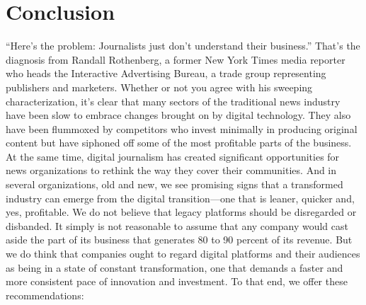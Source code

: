 \chapter{Conclusion}
``Here’s the problem: Journalists just don’t understand their business.''
That’s the diagnosis from Randall Rothenberg, a former New York Times media
reporter who heads the Interactive Advertising Bureau, a trade group representing
publishers and marketers.
Whether or not you agree with his sweeping characterization, it’s clear that
many sectors of the traditional news industry have been slow to embrace changes
brought on by digital technology. They also have been flummoxed by competitors
who invest minimally in producing original content but have siphoned off
some of the most profitable parts of the business.
At the same time, digital journalism has created significant opportunities for
news organizations to rethink the way they cover their communities. And in
several organizations, old and new, we see promising signs that a transformed
industry can emerge from the digital transition—one that is leaner, quicker and,
yes, profitable.
We do not believe that legacy platforms should be disregarded or disbanded.
It simply is not reasonable to assume that any company would cast aside the part
of its business that generates 80 to 90 percent of its revenue. But we do think
that companies ought to regard digital platforms and their audiences as being in
a state of constant transformation, one that demands a faster and more consistent
pace of innovation and investment.
To that end, we offer these recommendations:
